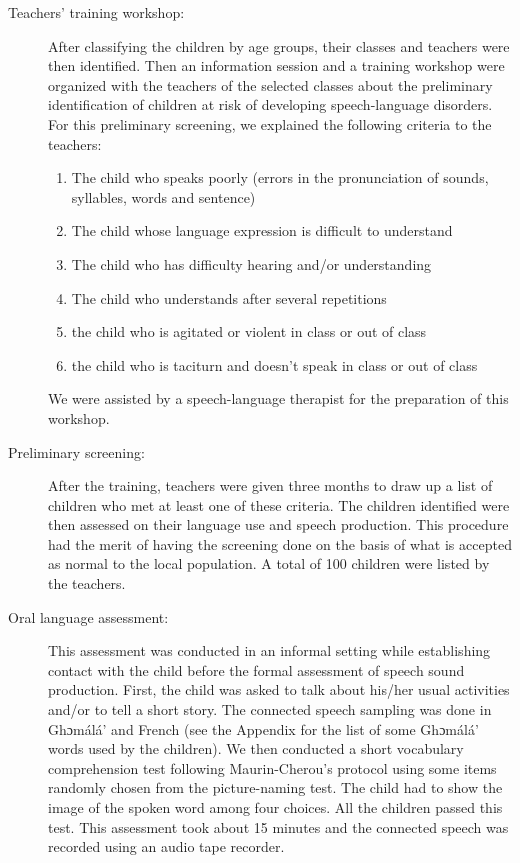 \documentclass[output=paper,newtxmath,modfonts,nonflat,draftmode]{langsci/langscibook}
\begin{document}
\begin{description}
\item[Teachers’ training workshop:] After classifying the children by age groups, their classes and teachers were then identified. Then an information session and a training workshop were organized with the teachers of the selected classes about the preliminary identification of children at risk of developing speech-language disorders. For this preliminary screening, we explained the following criteria to the teachers:

\begin{enumerate}
    \item The child who speaks poorly (errors in the pronunciation of sounds, syllables, words and sentence)
    \item The child whose language expression is difficult to understand
    \item The child who has difficulty hearing and/or understanding
    \item The child who understands after several repetitions
    \item the child who is agitated or violent in class or out of class
    \item the child who is taciturn and doesn’t speak in class or out of class
\end{enumerate}

We were assisted by a speech-language therapist for the preparation of this workshop. 

\item[Preliminary screening:] After the training, teachers were given three months to draw up a list of children who met at least one of these criteria. The children identified were then assessed on their language use and speech production. This procedure had the merit of having the screening done on the basis of what is accepted as normal to the local population. A total of 100 children were listed by the teachers.

\item [Oral language assessment:] This assessment was conducted in an informal setting while establishing contact with the child before the formal assessment of speech sound production. First, the child was asked to talk about his/her usual activities and/or to tell a short story. The connected speech sampling was done in Ghɔmálá’ and French (see the Appendix for the list of some Ghɔmálá’ words used by the children). We then conducted a short vocabulary comprehension test following Maurin-Cherou’s protocol using some items randomly chosen from the picture-naming test. The child had to show the image of the spoken word among four choices. All the children passed this test. This assessment took about 15 minutes and the connected speech was recorded using an audio tape recorder. 


\end{description}
\end{document}
